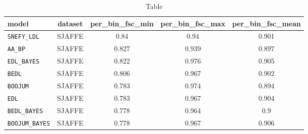 \begin{table}[h]
\centering
\caption{Table}
\label{tab:data}

\begin{tabular}{lcccc}
\toprule
\textbf{model} & \textbf{dataset} & \textbf{per\_bin\_fsc\_min} & \textbf{per\_bin\_fsc\_max} & \textbf{per\_bin\_fsc\_mean} \\
\midrule
\texttt{SNEFY\_LDL} & SJAFFE & 0.84 & 0.94 & 0.901 \\
\texttt{AA\_BP} & SJAFFE & 0.827 & 0.939 & 0.897 \\
\texttt{EDL\_BAYES} & SJAFFE & 0.822 & 0.976 & 0.905 \\
\texttt{BEDL} & SJAFFE & 0.806 & 0.967 & 0.902 \\
\texttt{BOOJUM} & SJAFFE & 0.783 & 0.974 & 0.894 \\
\texttt{EDL} & SJAFFE & 0.783 & 0.967 & 0.904 \\
\texttt{BEDL\_BAYES} & SJAFFE & 0.778 & 0.964 & 0.9 \\
\texttt{BOOJUM\_BAYES} & SJAFFE & 0.778 & 0.967 & 0.906 \\
\bottomrule
\end{tabular}

\end{table}